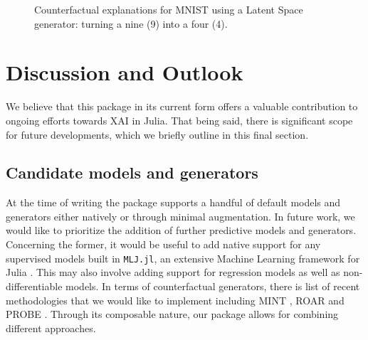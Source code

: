 \documentclass{juliacon}
\begin{document}
\begin{figure}
\begin{minipage}[t]{0.33\linewidth}
{\centering 


}

\end{minipage}%

\caption{\label{fig-mnist}Counterfactual explanations for MNIST using a
Latent Space generator: turning a nine (9) into a four (4).}

\end{figure}

\hypertarget{sec-outlook}{%
\section{Discussion and Outlook}\label{sec-outlook}}

We believe that this package in its current form offers a valuable
contribution to ongoing efforts towards XAI in Julia. That being said,
there is significant scope for future developments, which we briefly
outline in this final section.

\hypertarget{candidate-models-and-generators}{%
\subsection{Candidate models and
generators}\label{candidate-models-and-generators}}

At the time of writing the package supports a handful of default models
and generators either natively or through minimal augmentation. In
future work, we would like to prioritize the addition of further
predictive models and generators. Concerning the former, it would be
useful to add native support for any supervised models built in
\texttt{MLJ.jl}, an extensive Machine Learning framework for Julia
\cite{blaom2020mlj}. This may also involve adding support for regression
models as well as non-differentiable models. In terms of counterfactual
generators, there is list of recent methodologies that we would like to
implement including MINT \cite{karimi2021algorithmic}, ROAR
\cite{upadhyay2021robust} and PROBE
\cite{pawelczyk2022probabilistically}. Through its composable nature,
our package allows for combining different approaches.
\end{document}
